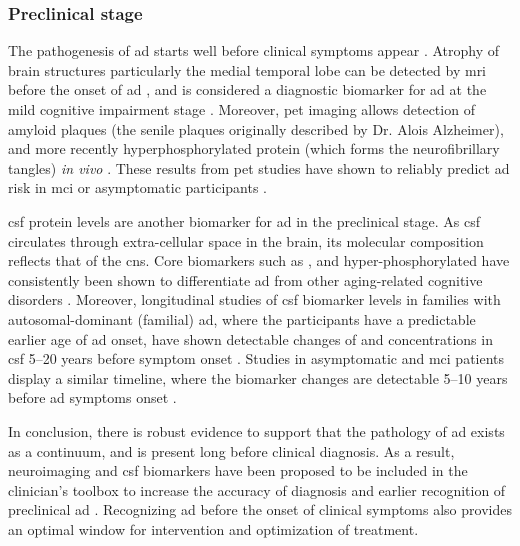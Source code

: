 \subsubsection{Preclinical stage \label{preclinical}}

The pathogenesis of \gls{ad} starts well before clinical symptoms appear \citep{dubois16}. Atrophy of brain structures particularly the medial temporal lobe can be detected by \gls{mri} before the onset of \gls{ad} \citep{jack92, scheltens92, chetelat03}, and is considered a diagnostic biomarker for \gls{ad} at the mild cognitive impairment stage \citep{jack99}. Moreover, \gls{pet} imaging allows detection of amyloid plaques (the senile plaques originally described by Dr. Alois Alzheimer), and more recently hyperphosphorylated \atau{} protein (which forms the neurofibrillary tangles) \textit{in vivo} \citep{mathis03, maruyama13, okamura13}. These results from \gls{pet} studies have shown to reliably predict \gls{ad} risk in \gls{mci} or asymptomatic participants \citep{klunk04, chien14, sepulcre16}.

\Gls{csf} protein levels are another biomarker for \gls{ad} in the preclinical stage. As \gls{csf} circulates through extra-cellular space in the brain, its molecular composition reflects that of the \gls{cns}. Core biomarkers such as \abeta{}, \atau{} and hyper-phosphorylated \atau{} have consistently been shown to differentiate \gls{ad} from other aging-related cognitive disorders \citep{blennow10}. Moreover, longitudinal studies of \gls{csf} biomarker levels in families with autosomal-dominant (familial) \gls{ad}, where the participants have a predictable earlier age of \gls{ad} onset, have shown detectable changes of \abeta{} and \atau{} concentrations in \gls{csf} \numrange{5}{20} years before symptom onset \citep{bateman12, fagan14}. Studies in asymptomatic and \gls{mci} patients display a similar timeline, where the biomarker changes are detectable \numrange{5}{10} years before \gls{ad} symptoms onset \citep{buchhave12, vos13}. 

In conclusion, there is robust evidence to support that the pathology of \gls{ad} exists as a continuum, and is present long before clinical diagnosis. As a result, neuroimaging and \gls{csf} biomarkers have been proposed to be included in the clinician's toolbox to increase the accuracy of diagnosis and earlier recognition of preclinical \gls{ad} \citep{ad16}. Recognizing \gls{ad} before the onset of clinical symptoms also provides an optimal window for intervention and optimization of treatment. 


